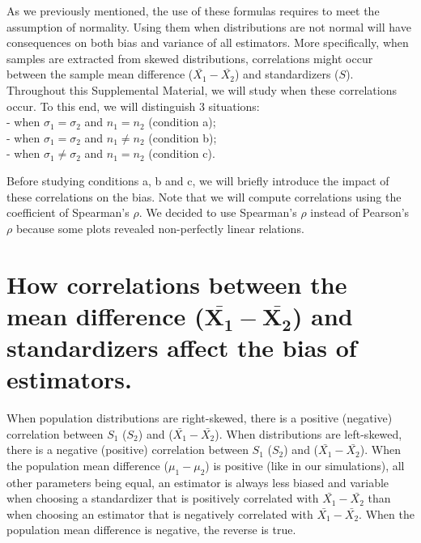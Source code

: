 \documentclass[
  english,
  man,mask]{apa6}
\begin{document}
As we previously mentioned, the use of these formulas requires to meet the assumption of normality. Using them when distributions are not normal will have consequences on both bias and variance of all estimators. More specifically, when samples are extracted from skewed distributions, correlations might occur between the sample mean difference (\(\bar{X_1}-\bar{X_2}\)) and standardizers (\(S\)). Throughout this Supplemental Material, we will study when these correlations occur. To this end, we will distinguish 3 situations:\\
- when \(\sigma_1=\sigma_2\) and \(n_1=n_2\) (condition a);\\
- when \(\sigma_1=\sigma_2\) and \(n_1\neq n_2\) (condition b);\\
- when \(\sigma_1 \neq \sigma_2\) and \(n_1 = n_2\) (condition c).

Before studying conditions a, b and c, we will briefly introduce the impact of these correlations on the bias. Note that we will compute correlations using the coefficient of Spearman's \(\rho\). We decided to use Spearman's \(\rho\) instead of Pearson's \(\rho\) because some plots revealed non-perfectly linear relations.

\hypertarget{how-correlations-between-the-mean-difference-bmbarx_1-barx_2-and-standardizers-affect-the-bias-of-estimators.}{%
\section{\texorpdfstring{How correlations between the mean difference (\(\bm{\bar{X_1}-\bar{X_2}}\)) and standardizers affect the bias of estimators.}{How correlations between the mean difference (\textbackslash bm\{\textbackslash bar\{X\_1\}-\textbackslash bar\{X\_2\}\}) and standardizers affect the bias of estimators.}}\label{how-correlations-between-the-mean-difference-bmbarx_1-barx_2-and-standardizers-affect-the-bias-of-estimators.}}

When population distributions are right-skewed, there is a positive (negative) correlation between \(S_1\) (\(S_2\)) and (\(\bar{X_1}-\bar{X_2}\)). When distributions are left-skewed, there is a negative (positive) correlation between \(S_1\) (\(S_2\)) and (\(\bar{X_1}-\bar{X_2}\)). When the population mean difference (\(\mu_1-\mu_2\)) is positive (like in our simulations), all other parameters being equal, an estimator is always less biased and variable when choosing a standardizer that is positively correlated with \(\bar{X_1}-\bar{X_2}\) than when choosing an estimator that is negatively correlated with \(\bar{X_1}-\bar{X_2}\). When the population mean difference is negative, the reverse is true.
\end{document}
